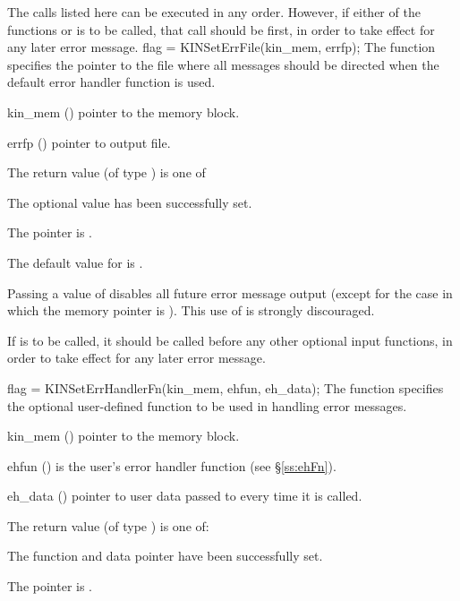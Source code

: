 The calls listed here can be executed in any order. However, if either of the
functions  or  is to be called, that
call should be first, in order to take effect for any later error message.
{
flag = KINSetErrFile(kin\_mem, errfp);
}
{
  The function  specifies the pointer to the file
  where all {\kinsol} messages should be directed when the default
  {\kinsol} error handler function is used.
}
{
  \begin{args}
  \item[kin\_mem] ()
    pointer to the {\kinsol} memory block.
  \item[errfp] ()
    pointer to output file.
  \end{args}
}
{
  The return value  (of type ) is one of
  \begin{args}
  \item[\Id{KIN\_SUCCESS}] 
    The optional value has been successfully set.
  \item[\Id{KIN\_MEM\_NULL}]
    The  pointer is .
  \end{args}
}
{
  The default value for  is . 

  Passing a value of  disables all future error message output
  (except for the case in which the {\kinsol} memory pointer is ).
  This use of  is strongly discouraged.

  {\warn}If  is to be called, it should be called before any
  other optional input functions, in order to take effect for any later error message.
}
{
flag = KINSetErrHandlerFn(kin\_mem, ehfun, eh\_data);
}
{
  The function  specifies the optional user-defined function
  to be used in handling error messages.
}
{
  \begin{args}
  \item[kin\_mem] ()
    pointer to the {\kinsol} memory block.
  \item[ehfun] ()
    is the user's {\C} error handler function (see \S\ref{ss:ehFn}).
  \item[eh\_data] ()
    pointer to user data passed to  every time it is called.
  \end{args}
}
{
  The return value  (of type ) is one of:
  \begin{args}
  \item[\Id{KIN\_SUCCESS}] 
    The function  and data pointer  have been successfully set.
  \item[\Id{KIN\_MEM\_NULL}]
    The  pointer is .
  \end{args}
}
